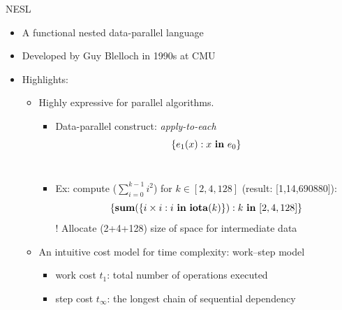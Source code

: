 \documentclass{beamer}
\begin{document}
\begin{frame}{NESL}
	\begin{itemize}
		\item A functional nested data-parallel language
		\item Developed by Guy Blelloch in 1990s at CMU
		\item Highlights: 
		\begin{itemize}
			\item Highly expressive for parallel algorithms. \\ 
			\begin{itemize}
			
			\item Data-parallel construct: \emph{apply-to-each} $$\{e_1(x) : x \ \mathbf{in} \ e_0 \} $$\\ 
	  \item Ex: compute ($\sum_{i=0}^{k-1} i^2$) for $k \in [2,4,128]$ (result: [1,14,690880]):
	  $$\{\mathbf{sum}(\{i \times i : i \ \mathbf{in} \ \mathbf{iota} (k) \}) : k \ \mathbf{in} \ [2,4,128]\}$$
	  ! Allocate {\color{blue} (2+4+128)} size of space for intermediate data
  		\end{itemize}
	  \item An intuitive cost model for time complexity: work--step model
	  \begin{itemize}
	  	\item work cost $t_1$: total number of operations executed
	  	\item step cost $t_\infty$: the longest chain of sequential dependency
	  \end{itemize}
	\end{itemize}
	\end{itemize}
  
\end{frame}
\end{document}
